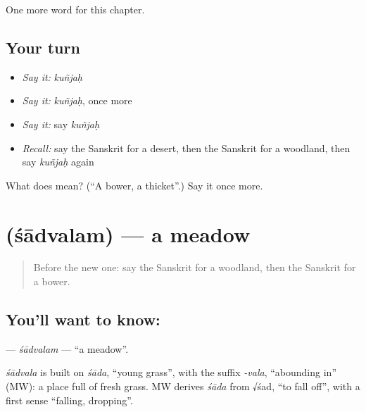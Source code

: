 \begin{grammarlens}[title={What you've built}]
One more word for this chapter.
\end{grammarlens}

\subsection*{Your turn}
\begin{itemize}
\raggedright
  \item \emph{Say it:} \emph{kuñjaḥ}
  \item \emph{Say it:} \emph{kuñjaḥ}, once more
  \item \emph{Say it:} say \emph{kuñjaḥ}
  \item \emph{Recall:} say the Sanskrit for a desert, then the Sanskrit for a woodland, then say \emph{kuñjaḥ} again
\end{itemize}

\begin{tcolorbox}[breakable,colback=teal!4,colframe=teal!35!black,title={Before you move on}]
What does  mean? (\textquotedblleft{}A bower, a thicket\textquotedblright{}.) Say it once more.
\end{tcolorbox}
\section[\texorpdfstring{\sk{शाद्वलम्} (śādvalam)}{शाद्वलम् (śādvalam)}]{ (śādvalam) — a meadow}

\label{lesson:SA-C225-sadvalam}



\begin{quote}
Before the new one: say the Sanskrit for a woodland, then the Sanskrit for a bower.
\end{quote}

\subsection*{You'll want to know: }
\textbf{} — \emph{śādvalam} — \textquotedblleft{}a meadow\textquotedblright{}.

\begin{cousinweb}
\emph{śādvala} is built on \emph{śāda}, \textquotedblleft{}young grass\textquotedblright{}, with the suffix \emph{-vala}, \textquotedblleft{}abounding in\textquotedblright{} (MW): a place full of fresh grass. MW derives \emph{śāda} from √śad, \textquotedblleft{}to fall off\textquotedblright{}, with a first sense \textquotedblleft{}falling, dropping\textquotedblright{}.
\end{cousinweb}

